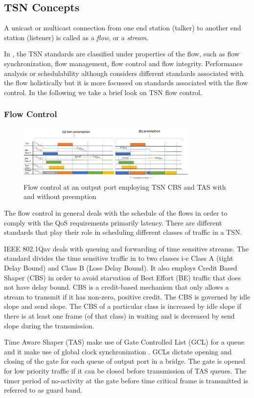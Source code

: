 \documentclass[journal,12pt,twocolumn]{IEEEtran}
\begin{document}
\subsection{TSN Concepts}
A unicast or multicast connection from one end station (talker) to another end station (listener) is called as a \emph {flow}, or a \emph {stream}.

In \cite{ULL}, the TSN standards are classified under properties of the flow, such as flow synchronization, flow management, flow control and flow integrity. Performance analysis or schedulability although considers different standards associated with the flow holistically but it is more focussed on standards associated with the flow control. In the following we take a brief look on TSN flow control.
\subsubsection{Flow Control}
\begin{figure}
\centering
\includegraphics[width=3.5in]{TSNFlowControl}
\caption{Flow control at an output port employing TSN CBS and TAS with and without preemption}
\label{TSN_FlowControl}
\end{figure}
The flow control in general deals with the schedule of the flows in order to comply with the QoS requirements primarily latency. There are different standards that play their role in scheduling different classes of traffic in a TSN. 

IEEE 802.1Qav \cite{IEEE802.1Qav} deals with queuing and forwarding of time sensitive streams. The standard divides the time sensitive traffic in to two classes i-e Class A (tight Delay Bound) and Class B (Lose Delay Bound). It also employs Credit Based Shaper (CBS) in order to avoid starvation of Best Effort (BE) traffic that does not have delay bound. CBS is a credit-based mechanism that only allows a stream to transmit if it has non-zero, positive credit. The CBS is governed by idle slope and send slope. The CBS of a particular class is increased by idle slope if there is at least one frame (of that class) in waiting and is decreased by send slope during the transmission.

Time Aware Shaper (TAS) \cite{IEEE802.1Qbv} make use of Gate Controlled List (GCL) for a queue and it make use of global clock synchronization \cite{IEEE802.1AS}. GCLs dictate opening and closing of the gate for each queue of output port in a bridge. The gate is opened for low priority traffic if it can be closed before transmission of TAS queues. The timer period of no-activity at the gate before time critical frame is transmitted is referred to as guard band.
\end{document}
